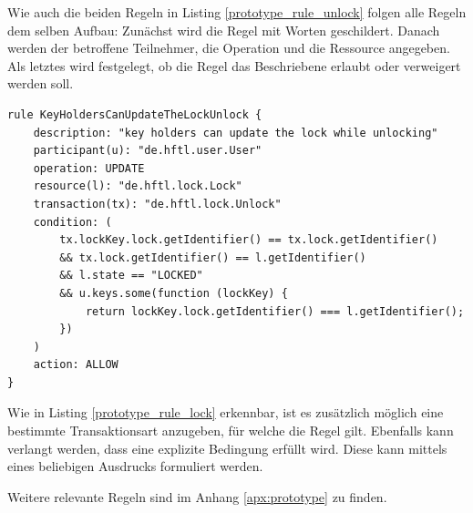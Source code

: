             \newpage
            Wie auch die beiden Regeln in Listing \ref{prototype_rule_unlock} folgen alle Regeln dem selben Aufbau: Zunächst wird die Regel mit Worten geschildert. 
            Danach werden der betroffene Teilnehmer, die Operation und die Ressource angegeben.
            Als letztes wird festgelegt, ob die Regel das Beschriebene erlaubt oder verweigert werden soll. 
            \medskip
            \begin{lstlisting}[caption={Auszug aus den Regeln für die Ressource \colorbox{light-gray}{\lstinline{Lock}}},label=prototype_rule_lock,captionpos=b]
rule KeyHoldersCanUpdateTheLockUnlock {
    description: "key holders can update the lock while unlocking"
    participant(u): "de.hftl.user.User"
    operation: UPDATE
    resource(l): "de.hftl.lock.Lock"
    transaction(tx): "de.hftl.lock.Unlock"
    condition: (
        tx.lockKey.lock.getIdentifier() == tx.lock.getIdentifier()
        && tx.lock.getIdentifier() == l.getIdentifier()
        && l.state == "LOCKED"
        && u.keys.some(function (lockKey) {
            return lockKey.lock.getIdentifier() === l.getIdentifier();
        })
    )
    action: ALLOW
}
            \end{lstlisting}
            Wie in Listing \ref{prototype_rule_lock} erkennbar, ist es zusätzlich möglich eine bestimmte Transaktionsart anzugeben, für welche die Regel gilt. 
            Ebenfalls kann verlangt werden, dass eine explizite Bedingung erfüllt wird. 
            Diese kann mittels eines beliebigen Ausdrucks formuliert werden.
            
            Weitere relevante Regeln sind im Anhang \ref{apx:prototype} zu finden.
